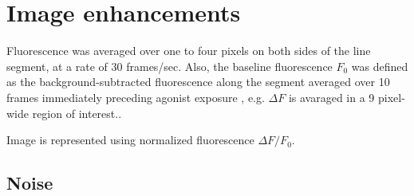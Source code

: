 \section{Image enhancements}

Fluorescence was averaged over one to four pixels on both sides of the line
segment, at a rate of 30 frames/sec. Also, the baseline fluorescence $F_0$ was
defined as the background-subtracted fluorescence along the segment averaged
over 10 frames immediately preceding agonist exposure \citep{wang1993lpf}, e.g.
$\Delta F$ is avaraged in a 9 pixel-wide region of interest..

Image is represented using normalized fluorescence $\Delta F/F_0$.


\subsection{Noise}

